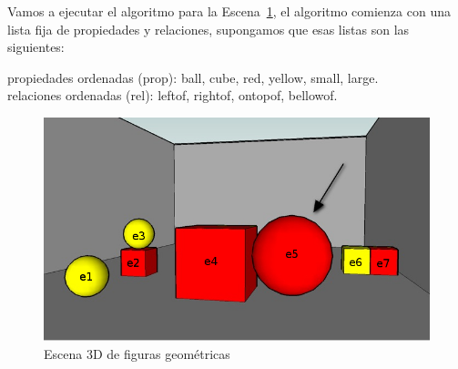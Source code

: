Vamos a ejecutar el algoritmo para la Escena~\ref{figure22},
el algoritmo comienza con una lista fija de propiedades y relaciones, supongamos que
esas listas son las siguientes:

propiedades ordenadas (prop): \textsf{ball}, \textsf{cube}, \textsf{red}, \textsf{yellow}, \textsf{small}, \textsf{large}.\\
relaciones ordenadas (rel): \textsf{leftof}, \textsf{rightof}, \textsf{ontopof}, \textsf{bellowof}.

\begin{figure}
\begin{center}	
\includegraphics[width=.5\textwidth]{images/22.jpg}
\end{center}
\vspace*{-1.5em}
\caption{Escena 3D de figuras geom\'etricas}\label{figure22}
\end{figure}

